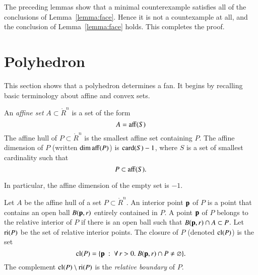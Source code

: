 %

The preceding lemmas show that a minimal counterexample satisfies all of the conclusions of Lemma~\ref{lemma:face}.  Hence it is not a countexample at all, and the conclusion of Lemma~\ref{lemma:face} holds.  This completes the proof.



\section{Polyhedron}

This section shows that a polyhedron determines a fan.  It begins by recalling basic terminology about affine and convex sets.

\begin{definition}
An  {\it affine set} $A\subset\ring{R}^n$ is a set of the form
$$
A={\operatorname{aff}}(S)
$$
The
affine hull of $P\subset\ring{R}^n$ is the smallest affine set containing $P$.  The affine dimension of $P$ (written $\operatorname{dim\,aff}(P)$) is ${\operatorname{card}}(S)-1$, where $S$ is a set of smallest cardinality such that
$$
P \subset {\operatorname{aff}}(S).
$$
\end{definition}
In particular, the affine dimension of the empty set is $-1$.
%
%
%
%
%

\begin{definition} Let $A$ be the affine hull of a set $P\subset\ring{R}^n$.    An interior point ${\mathbf p}$ of $P$ is a point that contains an open ball $B({\mathbf p},r)$ entirely contained in $P$.  A point ${\mathbf p}$ of $P$ belongs to the relative interior of $P$ if there is an open ball such that $B({\mathbf p},r) \cap A\subset P$.  Let ${\operatorname{ri}}(P)$ be the set of relative interior points.  The closure of $P$ (denoted ${\operatorname{cl}}(P)$)  is the set
$$
{\operatorname{cl}}(P) = \{{\mathbf p} \ :\  \forall\,r >0.~ B({\mathbf p},r) \cap P \ne \varnothing\}.
$$
The complement ${\operatorname{cl}}(P)\setminus {\operatorname{ri}}(P)$ is the {\it relative boundary} of $P$.
\end{definition}
%
%
%
%
%
%
%

